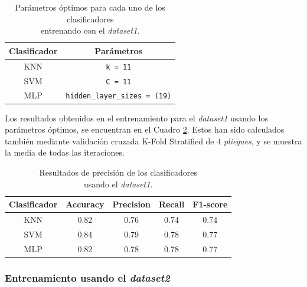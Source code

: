 \begin{table}[H]
\begin{center}
\begin{tabular}{|c|c|}
     \hline
    \textbf{Clasificador} & \textbf{Parámetros} \\
    \hline
     KNN & \verb|k = 11| \\
     SVM & \verb|C = 11| \\
     MLP & \verb|hidden_layer_sizes = (19)|\\
     \hline
 \end{tabular}
 \captionsetup{justification=centering}
\caption{Parámetros óptimos para cada uno de los clasificadores\\
entrenando con el \textit{dataset1}.}
\label{cuadro:parametros_dataset1}
\end{center}
\end{table}

Los resultados obtenidos en el entrenamiento para el \textit{dataset1} usando los parámetros óptimos, se encuentran en el Cuadro \ref{cuadro:resultados_dataset1}. Estos han sido calculados también mediante validación cruzada K-Fold Stratified de 4 \textit{pliegues}, y se muestra la media de todas las iteraciones.\\

\begin{table}[H]
\begin{center}
\begin{tabular}{|c|c|c|c|c|}
     \hline
    \textbf{Clasificador} & \textbf{Accuracy} & \textbf{Precision} & \textbf{Recall} & \textbf{F1-score}\\
    \hline
     KNN & 0.82 & 0.76 & 0.74 & 0.74\\
     SVM & 0.84 & 0.79 & 0.78 & 0.77\\
     MLP & 0.82 & 0.78 & 0.78 & 0.77\\
     \hline
 \end{tabular}
 \captionsetup{justification=centering}
\caption{Resultados de precisión de los clasificadores\\
usando el \textit{dataset1}.}
\label{cuadro:resultados_dataset1}
\end{center}
\end{table}

\subsubsection{Entrenamiento usando el \textit{dataset2}}

